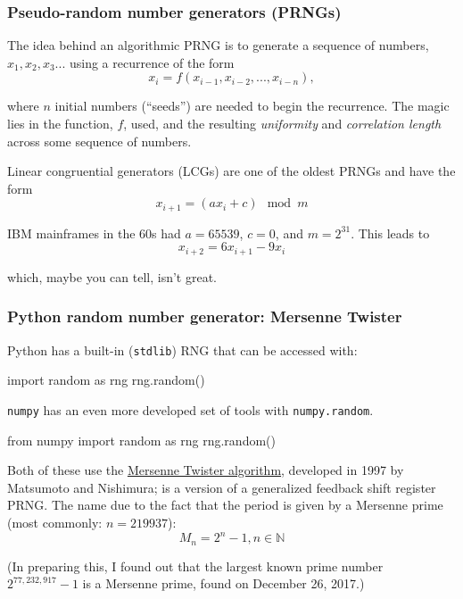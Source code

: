 \documentclass[hyperref={colorlinks=true}]{beamer}
\begin{document}

\begin{frame}%
  \frametitle{Pseudo-random number generators (PRNGs)}
  
  The idea behind an algorithmic PRNG is to generate a sequence of numbers, $x_1, x_2, x_3 ...$ using a recurrence of the form
  \begin{equation}
    x_i = f(x_{i-1}, x_{i-2}, ..., x_{i-n}),
  \end{equation}

  where $n$ initial numbers (``seeds'') are needed to begin the recurrence. The magic lies in the function, $f$, used, and the resulting \textit{uniformity} and \textit{correlation length} across some sequence of numbers. 
  
  Linear congruential generators (LCGs) are one of the oldest PRNGs and have the form
  \begin{equation}
    x_{i+1} = (a x_i + c) \mod m
  \end{equation}

  IBM mainframes in the 60s had $a = 65539$, $c = 0$, and $m = 2^{31}$. This leads to
  \begin{equation}
    x_{i+2} = 6 x_{i+1} - 9x_i
  \end{equation}

  which, maybe you can tell, isn't great. 

\end{frame}


\begin{frame}[fragile]%
  \frametitle{Python random number generator: Mersenne Twister}
  
  Python has a built-in (\texttt{stdlib}) RNG that can be accessed with:
  
  \begin{ucpythonblock}{}
import random as rng
rng.random()  
  \end{ucpythonblock}

  \texttt{numpy} has an even more developed set of tools with \texttt{numpy.random}. 
  
  \begin{ucpythonblock}{}
from numpy import random as rng
rng.random()  
  \end{ucpythonblock}  

  Both of these use the \href{https://en.wikipedia.org/wiki/Mersenne_Twister}{Mersenne Twister algorithm}, developed in 1997 by Matsumoto and Nishimura; is a version of a generalized feedback shift register PRNG. The name due to the fact that the period is given by a Mersenne prime (most commonly: $n = 219937$):
  \begin{equation}
    M_n = 2^n - 1, n \in  \mathbb{N}
  \end{equation}

  (In preparing this, I found out that the largest known prime number $2^{77,232,917} - 1$ is a Mersenne prime, found on December 26, 2017.)

\end{frame}
\end{document}
